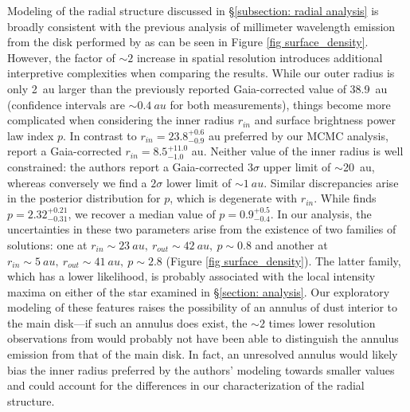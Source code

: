 \documentclass[modern]{aastex62}
\begin{document}
Modeling of the radial structure discussed in \S \ref{subsection: radial analysis} is broadly consistent with the previous analysis of millimeter wavelength emission from the disk performed by \cite{macgregor13} as can be seen in Figure \ref{fig surface_density}. 
However, the factor of $\sim 2$ increase in spatial resolution introduces additional interpretive complexities when comparing the results.
While our outer radius is only \SI{2}{au} larger than the previously reported Gaia-corrected value of \SI{38.9}{au} (confidence intervals are $\sim \SI{0.4}{au}$ for both measurements), things become more complicated when considering the inner radius $r_{in}$ and surface brightness power law index $p$.
In contrast to $r_{in} = 23.8_{-0.9}^{ +0.6}$ \si{au} preferred by our MCMC analysis, \cite{macgregor13} report a Gaia-corrected $r_{in} = 8.5_{-1.0} ^{+11.0}$ \si{au}.
Neither value of the inner radius is well constrained: the authors report a Gaia-corrected $3 \sigma$ upper limit of $\sim$\SI{20}{au}, whereas conversely we find a $2 \sigma$ lower limit of $\sim \SI{1}{au}$.
Similar discrepancies arise in the posterior distribution for $p$, which is degenerate with $r_{in}$.
While \cite{macgregor13} finds $p=2.32_{-0.31}^{+0.21}$, we recover a median value of $p=0.9_{-0.4}^{+0.5}$.
In our analysis, the uncertainties in these two parameters arise from the existence of two families of solutions: one at $r_{in} \sim \SI{23}{au},\ r_{out} \sim \SI{42}{au},\ p \sim 0.8$ and another at $r_{in} \sim \SI{5}{au},\ r_{out} \sim \SI{41}{au},\ p \sim 2.8$ (Figure \ref{fig surface_density}).
The latter family, which has a lower likelihood, is probably associated with the local intensity maxima on either of the star examined in \S \ref{section: analysis}.
Our exploratory modeling of these features raises the possibility of an annulus of dust interior to the main disk---if such an annulus does exist, the $\sim 2$ times lower resolution observations from \cite{macgregor13} would probably not have been able to distinguish the annulus emission from that of the main disk.
In fact, an unresolved annulus would likely bias the inner radius preferred by the authors' modeling towards smaller values and could account for the differences in our characterization of the radial structure.
\end{document}
